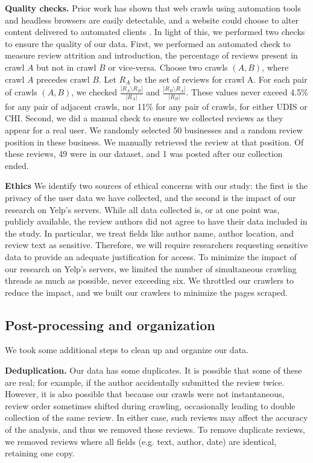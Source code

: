 \textbf{Quality checks.}
Prior work has shown that web crawls using automation tools and headless browsers are easily detectable, and a website could choose to alter content delivered to automated clients \cite{jueckstock2021towards}. In light of this, we performed two checks to ensure the quality of our data. First, we performed an automated check to measure review attrition and introduction, the percentage of reviews present in crawl $A$ but not in crawl $B$ or vice-versa. Choose two crawls $(A,B)$, where crawl $A$ precedes crawl $B$. Let $R_A$ be the set of reviews for crawl A. For each pair of crawls $\left(A,B\right)$, we checked $\frac{\left|R_A \setminus R_B\right|}{\left|R_A\right|}$ and $\frac{\left|R_B \setminus R_A\right|}{\left|R_B\right|}$. These values never exceed 4.5\% for any pair of adjacent crawls, nor 11\% for any pair of crawls, for either UDIS or CHI. Second, we did a manual check to ensure we collected reviews as they appear for a real user. We randomly selected 50 businesses and a random review position in these business. We manually retrieved the review at that position. Of these reviews, 49 were in our dataset, and 1 was posted after our collection ended.

\textbf{Ethics}
We identify two sources of ethical concerns with our study: the first is the privacy of the user data we have collected, and the second is the impact of our research on Yelp's servers. While all data collected is, or at one point was, publicly available, the review authors did not agree to have their data included in the study. In particular, we treat fields like author name, author location, and review text as sensitive. Therefore, we will require researchers requesting sensitive data to provide an adequate justification for access. To minimize the impact of our research on Yelp's servers, we limited the number of simultaneous crawling threads as much as possible, never exceeding six. We throttled our crawlers to reduce the impact, and we built our crawlers to minimize the pages scraped.

\subsection{Post-processing and organization} \label{subsec:rim:organization}

We took some additional steps to clean up and organize our data.

\textbf{Deduplication.}
Our data has some duplicates. It is possible that some of these are real; for example, if the author accidentally submitted the review twice. However, it is also possible that because our crawls were not instantaneous, review order sometimes shifted during crawling, occasionally leading to double collection of the same review. In either case, such reviews may affect the accuracy of the analysis, and thus we removed these reviews.
To remove duplicate reviews, we removed reviews where all fields (e.g. text, author, date) are identical, retaining one copy.

